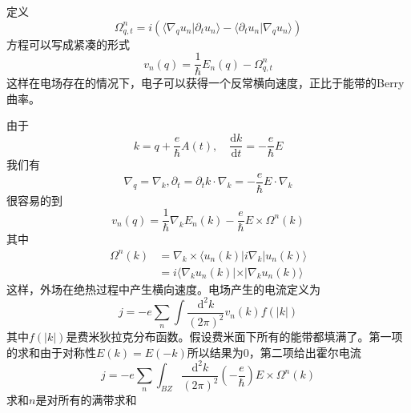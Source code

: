 \documentclass{article}
\numberwithin{equation}{subsection}
\begin{document}
定义
\begin{equation}
    \Omega_{q,t}^n=i\left(\langle\nabla_qu_n|\partial_tu_n\rangle-\langle\partial_tu_n|\nabla_qu_n\rangle\right)
\end{equation}
方程可以写成紧凑的形式
\begin{equation}
    v_n(q)=\frac{1}{\hbar}E_n(q)-\Omega_{q,t}^n
\end{equation}
这样在电场存在的情况下，电子可以获得一个反常横向速度，正比于能带的Berry曲率。

由于
\begin{equation}
    k=q+\frac{e}{\hbar}A(t),\quad\frac{\mathrm{d}k}{\mathrm{d}t}=-\frac{e}{\hbar}E
\end{equation}
我们有
\begin{equation}
    \nabla_q=\nabla_k,\partial_t=\partial_tk\cdot\nabla_k=-\frac{e}{\hbar}E\cdot\nabla_k
\end{equation}
很容易的到
\begin{equation}
    v_n(q)=\frac{1}{\hbar}\nabla_kE_n(k)-\frac{e}{\hbar}E\times\Omega^n(k)
\end{equation}
其中
\begin{equation}
    \begin{split}
        \Omega^n(k)&=\nabla_k\times\langle u_n(k)|i\nabla_k|u_n(k)\rangle\\
        &=i\langle\nabla_ku_n(k)|\times|\nabla_ku_n(k)\rangle
    \end{split}
\end{equation}
这样，外场在绝热过程中产生横向速度。电场产生的电流定义为
\begin{equation}
    j=-e\sum_n\int\frac{\mathrm{d}^2k}{(2\pi)^2}v_n(k)f(|k|)
\end{equation}
其中$f(|k|)$是费米狄拉克分布函数。假设费米面下所有的能带都填满了。第一项的求和由于对称性$E(k)=E(-k)$所以结果为$0$，第二项给出霍尔电流
\begin{equation}
    j=-e\sum_n\int_{BZ}\frac{\mathrm{d}^2k}{(2\pi)^2}(-\frac{e}{\hbar})E\times\Omega^n(k)
\end{equation}
求和$n$是对所有的满带求和
\end{document}
